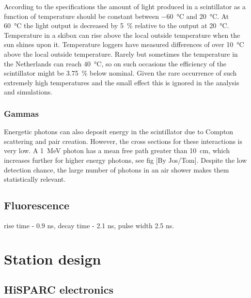 According to the specifications the amount of light produced in a scintillator as a function of temperature should be constant between \SI{-60}{\degreeCelsius} and \SI{20}{\degreeCelsius}. At \SI{60}{\degreeCelsius} the light output is decreased by \SI{5}{\percent} relative to the output at \SI{20}{\degreeCelsius}. Temperature in a skibox can rise above the local outside temperature when the sun shines upon it. Temperature loggers have measured differences of over \SI{10}{\degreeCelsius} above the local outside temperature. Rarely but sometimes the temperature in the Netherlands can reach \SI{40}{\degreeCelsius}, so on such occasions the efficiency of the scintillator might be \SI{3.75}{\percent} below nominal. Given the rare occurrence of such extremely high temperatures and the small effect this is ignored in the analysis and simulations.


\subsubsection{Gammas}


Energetic photons can also deposit energy in the scintillator due to Compton scattering and pair creation. However, the cross sections for these interactions is very low. A \SI{1}{\MeV} photon  has a mean free path greater than \SI{10}{\centi\meter}, which increases further for higher energy photons, see fig [By Jos/Tom]. Despite the low detection chance, the large number of photons in an air shower makes them statistically relevant.



\subsection{Fluorescence}

rise time - 0.9 ns, decay time - 2.1 ns, pulse width 2.5 ns.



\section{Station design}
\label{sec:station-design}

\subsection{HiSPARC electronics}

